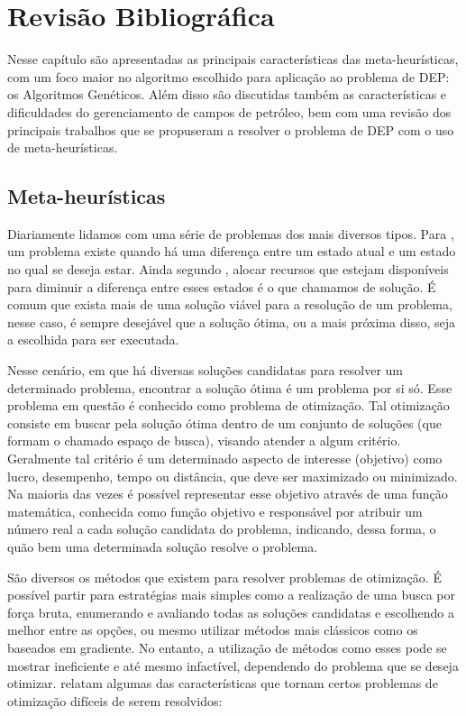 \chapter{Revisão Bibliográfica}
\label{ch:ch2}
Nesse capítulo são apresentadas as principais características das meta-heurísticas, com um foco maior no algoritmo escolhido para aplicação ao problema de DEP: os Algoritmos Genéticos. Além disso são discutidas também as características e dificuldades do gerenciamento de campos de petróleo, bem com uma revisão dos principais trabalhos que se propuseram a resolver o problema de DEP com o uso de meta-heurísticas.

\section{Meta-heurísticas}
\label{sec:section21}
Diariamente lidamos com uma série de problemas dos mais diversos tipos. Para \cite{Michalewicz2004}, um problema existe quando há uma diferença entre um estado atual e um estado no qual se deseja estar. Ainda segundo \cite{Michalewicz2004}, alocar recursos que estejam disponíveis para diminuir a diferença entre esses estados é o que chamamos de solução. É comum que exista mais de uma solução viável para a resolução de um problema, nesse caso, é sempre desejável que a solução ótima, ou a mais próxima disso, seja a escolhida para ser executada.

Nesse cenário, em que há diversas soluções candidatas para resolver um determinado problema, encontrar a solução ótima é um problema por si só. Esse problema em questão é conhecido como problema de otimização.  Tal otimização consiste em buscar pela solução ótima dentro de um conjunto de soluções (que formam o chamado espaço de busca), visando atender a algum critério. Geralmente tal critério é um determinado aspecto de interesse (objetivo) como lucro, desempenho, tempo ou distância, que deve ser maximizado ou minimizado. Na maioria das vezes é possível representar esse objetivo através de uma função matemática, conhecida como função objetivo e responsável por atribuir um número real a cada solução candidata do problema, indicando, dessa forma, o quão bem uma determinada solução resolve o problema.

São diversos os métodos que existem para resolver problemas de otimização. É possível partir para estratégias mais simples como a realização de uma busca por força bruta, enumerando e avaliando todas as soluções candidatas e escolhendo a melhor entre as opções, ou mesmo utilizar métodos mais clássicos como os baseados em gradiente. No entanto, a utilização de métodos como esses pode se mostrar ineficiente e até mesmo infactível, dependendo do problema que se deseja otimizar. \cite{Michalewicz2004} relatam algumas das características que tornam certos problemas de otimização difíceis de serem resolvidos:

